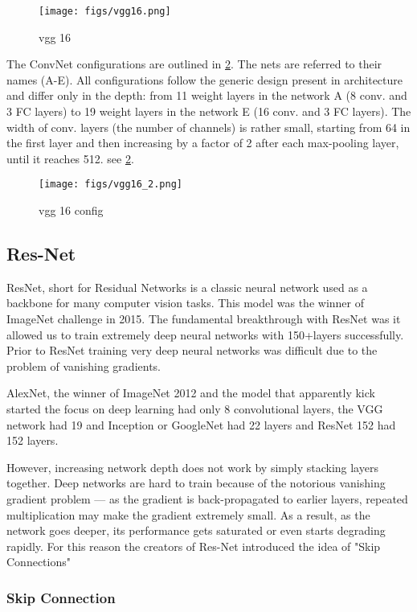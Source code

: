 \begin{figure}[!htpb]
	\centering
	\texttt{[image: figs/vgg16.png]}
	\caption{vgg 16}\label{fig:vgg16}
\end{figure}

The ConvNet configurations are outlined in \cref{fig:vgg16_2}. The nets are referred to their names (A-E). All configurations follow the generic design present in architecture and differ only in the depth: from 11 weight layers in the network A (8 conv. and 3 FC layers) to 19 weight layers in the network E (16 conv. and 3 FC layers). The width of conv. layers (the number of channels) is rather small, starting from 64 in the first layer and then increasing by a factor of 2 after each max-pooling layer, until it reaches 512. see \cref{fig:vgg16_2}.

\begin{figure}[!htpb]
	\centering
	\texttt{[image: figs/vgg16\_2.png]}
	\caption{vgg 16 config}\label{fig:vgg16_2}
\end{figure}

\subsection{Res-Net}

ResNet, short for Residual Networks is a classic neural network used as a backbone for many computer vision tasks. This model was the winner of ImageNet challenge in 2015. The fundamental breakthrough with ResNet was it allowed us to train extremely deep neural networks with 150+layers successfully. Prior to ResNet training very deep neural networks was difficult due to the problem of vanishing gradients.

AlexNet, the winner of ImageNet 2012 and the model that apparently kick started the focus on deep learning had only 8 convolutional layers, the VGG network had 19 and Inception or GoogleNet had 22 layers and ResNet 152 had 152 layers.

However, increasing network depth does not work by simply stacking layers together. Deep networks are hard to train because of the notorious vanishing gradient problem — as the gradient is back-propagated to earlier layers, repeated multiplication may make the gradient extremely small. As a result, as the network goes deeper, its performance gets saturated or even starts degrading rapidly. For this reason the creators of Res-Net introduced the idea of "Skip Connections"

\subsubsection{Skip Connection}

